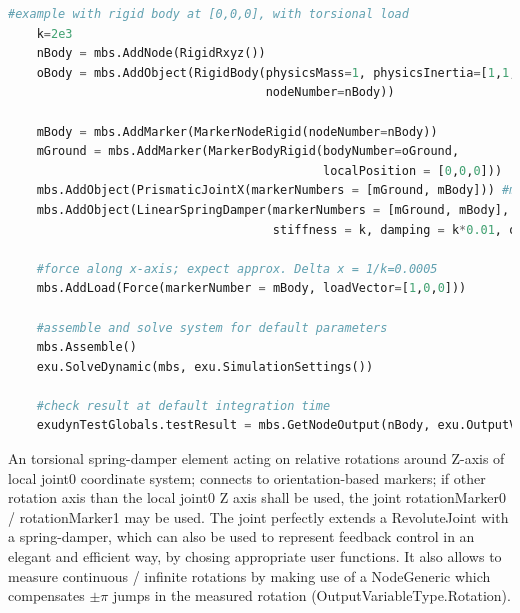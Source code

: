 \begin{lstlisting}[language=Python, firstnumber=1]
    #example with rigid body at [0,0,0], with torsional load
    k=2e3
    nBody = mbs.AddNode(RigidRxyz())
    oBody = mbs.AddObject(RigidBody(physicsMass=1, physicsInertia=[1,1,1,0,0,0], 
                                    nodeNumber=nBody))
    
    mBody = mbs.AddMarker(MarkerNodeRigid(nodeNumber=nBody))
    mGround = mbs.AddMarker(MarkerBodyRigid(bodyNumber=oGround, 
                                            localPosition = [0,0,0]))
    mbs.AddObject(PrismaticJointX(markerNumbers = [mGround, mBody])) #motion along ground X-axis
    mbs.AddObject(LinearSpringDamper(markerNumbers = [mGround, mBody], axisMarker0=[1,0,0],
                                     stiffness = k, damping = k*0.01, offset = 0))

    #force along x-axis; expect approx. Delta x = 1/k=0.0005
    mbs.AddLoad(Force(markerNumber = mBody, loadVector=[1,0,0])) 

    #assemble and solve system for default parameters
    mbs.Assemble()
    exu.SolveDynamic(mbs, exu.SimulationSettings())
    
    #check result at default integration time
    exudynTestGlobals.testResult = mbs.GetNodeOutput(nBody, exu.OutputVariableType.Displacement)[0]

\end{lstlisting}

\newpage


\label{sec:item:ObjectConnectorTorsionalSpringDamper}
An torsional spring-damper element acting on relative rotations around Z-axis of local joint0 coordinate system; connects to orientation-based markers; if other rotation axis than the local joint0 Z axis shall be used, the joint rotationMarker0 / rotationMarker1 may be used. The joint perfectly extends a RevoluteJoint with a spring-damper, which can also be used to represent feedback control in an elegant and efficient way, by chosing appropriate user functions. It also allows to measure continuous / infinite rotations by making use of a NodeGeneric which compensates $\pm \pi$ jumps in the measured rotation (OutputVariableType.Rotation).
\vspace{12pt}\\

